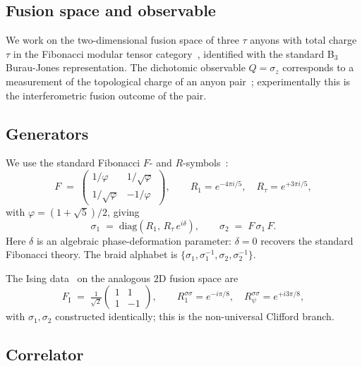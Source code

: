 \documentclass[aps,prx,reprint,amsmath,amssymb,floatfix,nofootinbib,superscriptaddress]{revtex4-2}
\begin{document}
\subsection{Fusion space and observable}

We work on the two-dimensional fusion space of three $\tau$ anyons
with total charge $\tau$ in the Fibonacci modular tensor
category~\cite{NayakSimonStern2008}, identified with the standard
B$_{3}$ Burau-Jones representation. The dichotomic observable
$Q = \sigma_{z}$ corresponds to a measurement of the topological
charge of an anyon pair~\cite{Bonderson2008}; experimentally this is
the interferometric fusion outcome of the pair.

\subsection{Generators}

We use the standard Fibonacci $F$- and $R$-symbols~\cite{NayakSimonStern2008}:
\begin{equation}
  F \;=\;
  \begin{pmatrix} 1/\varphi & 1/\sqrt{\varphi} \\
                  1/\sqrt{\varphi} & -1/\varphi \end{pmatrix},
  \qquad
  R_{1} = e^{-4\pi i/5}, \quad R_{\tau} = e^{+3\pi i/5},
\end{equation}
with $\varphi = (1+\sqrt{5})/2$, giving
\begin{equation}
  \sigma_{1} \;=\; \mathrm{diag}(R_{1},\,R_{\tau}\,e^{i\delta}),
  \qquad
  \sigma_{2} \;=\; F\,\sigma_{1}\,F.
\end{equation}
Here $\delta$ is an algebraic phase-deformation parameter: $\delta=0$
recovers the standard Fibonacci theory. The braid alphabet is
$\{\sigma_{1},\sigma_{1}^{-1},\sigma_{2},\sigma_{2}^{-1}\}$.

The Ising data~\cite{NayakSimonStern2008} on the analogous $2$D
fusion space are
\begin{equation}
  F_{\mathrm{I}} \;=\; \tfrac{1}{\sqrt{2}}
  \begin{pmatrix} 1 & 1 \\ 1 & -1 \end{pmatrix},
  \qquad
  R^{\sigma\sigma}_{1} = e^{-i\pi/8},
  \quad
  R^{\sigma\sigma}_{\psi} = e^{+i 3\pi/8},
\end{equation}
with $\sigma_{1},\sigma_{2}$ constructed identically; this is the
non-universal Clifford branch.

\subsection{Correlator}
\end{document}
